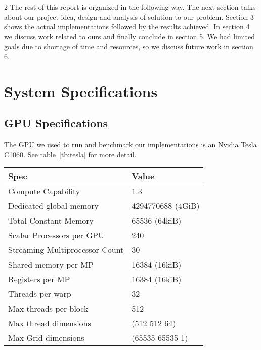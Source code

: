 \documentclass[10pt]{article}
\begin{document}
\begin{multicols}{2}
  The rest of this report is organized in the following way.
  The next section talks about our project idea, design and analysis of solution to our problem.
  Section 3 shows the actual implementations followed by the results achieved.
  In section 4 we discuss work related to ours and finally conclude in section 5.
  We had limited goals due to shortage of time and resources, so we discuss future work in section 6.

  \section{System Specifications}
  \subsection{GPU Specifications}
  The GPU we used to run and benchmark our implementations is an Nvidia Tesla C1060.
  See table~\ref{tb:tesla} for more detail.

  \begin{table*}[!ht]\centering
    \begin{tabular}{@{}l l@{}}\toprule
      \bf{Spec}                       &   \bf{Value}          \\
      \hline
      Compute Capability              &   1.3                 \\
      Dedicated global memory         &   4294770688 (4GiB)   \\
      Total Constant Memory           &   65536 (64kiB)       \\
      Scalar Processors per GPU       &   240                 \\
      Streaming Multiprocessor Count  &   30                  \\
      Shared memory per MP            &   16384 (16kiB)       \\
      Registers per MP                &   16384 (16kiB)       \\
      Threads per warp                &   32                  \\
      Max threads per block           &   512                 \\
      Max thread dimensions           &   (512 512 64)        \\
      Max Grid dimensions             &   (65535 65535 1)     \\
      \hline
    \end{tabular}
    \caption{Nvidia Tesla C1060 Specifications}
    \label{tb:tesla}
  \end{table*}


\end{multicols}
\end{document}
